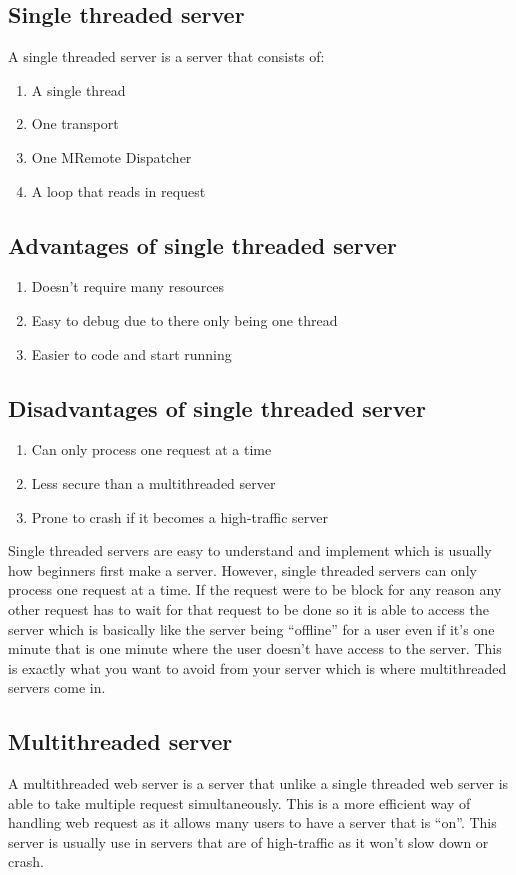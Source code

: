 \documentclass[conference]{IEEEtran}
\begin{document}
\subsection*{Single  threaded server}
A single threaded server is a server  that  consists  of:
\begin{enumerate}
	\item A single thread
	\item One transport
	\item One MRemote Dispatcher
	\item A loop that reads in request
\end{enumerate}
\subsection*{Advantages of single threaded server}
\begin{enumerate}
	\item Doesn’t require many resources
	\item Easy to debug due to there only being one thread
	\item Easier to code and start running
\end{enumerate}
\subsection*{Disadvantages of single threaded server}
\begin{enumerate}
	\item Can only process one request at a time
	\item Less secure than a multithreaded server
	\item Prone to crash if it becomes a high-traffic server
\end{enumerate}
Single  threaded servers are easy to understand and  implement   which is usually how beginners first make a server.  However, single threaded servers can only process one request at a time. If the  request were to be block for any reason any other request has to wait for that request to be done so it is able to access the server which is basically like the server being “offline” for a user even if it's one minute that is one minute where the user doesn’t have access to the server. This is exactly what you want  to avoid from  your  server which is where multithreaded servers come in.
\subsection*{Multithreaded  server}
A multithreaded web server is a server that unlike a single threaded web server is able to take multiple request simultaneously. This is a more efficient way of handling web request as it allows many  users to have a server that is “on”. This server is usually  use in servers that are of high-traffic as it won’t slow down  or crash.
\end{document}
